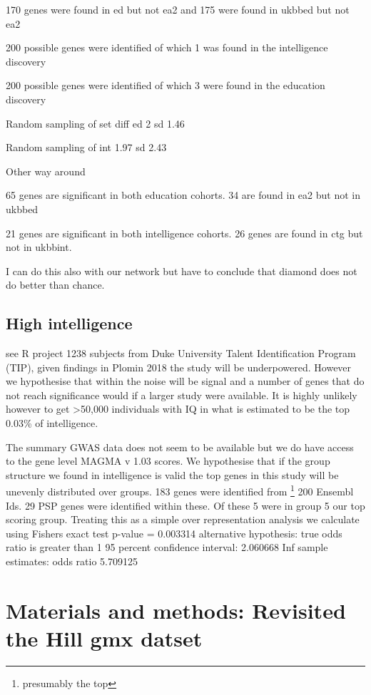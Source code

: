 170 genes were found in ed but not ea2 and 175 were found in ukbbed but not ea2

200 possible genes were identified of which 1 was found in the intelligence discovery

200 possible genes were identified of which 3 were found in the education discovery

Random sampling of set diff ed 2 sd 1.46

Random sampling of int 1.97 sd 2.43

Other way around

65 genes are significant in both education cohorts. 34 are found in ea2 but not in ukbbed

21 genes are significant in both intelligence cohorts. 26 genes are found in ctg but not in ukbbint. 

I can do this also with our network but have to conclude that diamond does not do better than chance. 
\subsection{High intelligence}
\cite{zabaneh2018genome}
see R project
1238 subjects from Duke University Talent Identification Program (TIP), given findings in Plomin 2018 the study will be underpowered. However we hypothesise that within the noise will be signal and a number of genes that do not reach significance would if a larger study were available. It is highly unlikely however to get >50,000 individuals with IQ in what is estimated to be the top 0.03\% of intelligence. 

The summary GWAS data does not seem to be available but we do have access to the gene level MAGMA v 1.03 scores. We hypothesise that if the group structure we found in intelligence is valid the top genes in this study will be unevenly distributed over groups. 183 genes were identified from \footnote{presumably the top} 200 Ensembl Ids. 29 PSP genes were identified within these. Of these 5 were in group 5 our top scoring group. Treating this as a simple over representation analysis we calculate using Fishers exact test 	
p-value = 0.003314
alternative hypothesis: true odds ratio is greater than 1
95 percent confidence interval:
 2.060668      Inf
sample estimates:
odds ratio 
  5.709125 




\section{Materials and methods: Revisited the Hill gmx datset}

